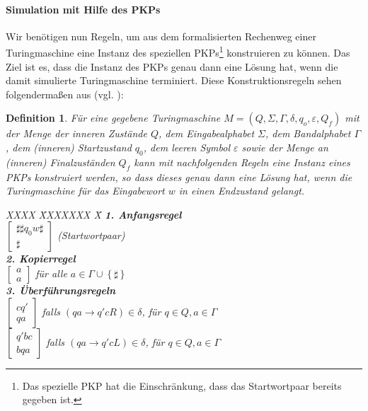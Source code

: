 \documentclass[]{scrartcl}
\newtheorem{definition}{Definition}[section]
\begin{document}
		\paragraph{Simulation mit Hilfe des PKPs}
			Wir benötigen nun Regeln, um aus dem formalisierten Rechenweg einer Turingmaschine eine Instanz des speziellen PKPs\footnote{Das spezielle PKP hat die Einschränkung, dass das Startwortpaar bereits gegeben ist.} konstruieren zu können. Das Ziel ist es, dass die Instanz des PKPs genau dann eine Lösung hat, wenn die damit simulierte Turingmaschine terminiert. Diese Konstruktionsregeln sehen folgendermaßen aus (vgl. \cite{wegener}):
			\begin{definition}
				\label{def-simulation}
				Für eine gegebene Turingmaschine $M = (Q, \Sigma, \varGamma, \delta, q_o, \varepsilon ,Q_f)$ mit der Menge der inneren Zustände $Q$, dem Eingabealphabet $\Sigma$, dem Bandalphabet $\varGamma$, dem (inneren) Startzustand $q_0$, dem leeren Symbol $\varepsilon$ sowie der Menge an (inneren) Finalzuständen $Q_f$ kann mit nachfolgenden Regeln eine Instanz eines PKPs konstruiert werden, so dass dieses genau dann eine Lösung hat, wenn die Turingmaschine für das Eingabewort $w$ in einen Endzustand gelangt.
				\begin{tabbing}
					XXXX \= XXXXXXX \= X \kill
						\textbf{1. Anfangsregel}\\
							\> \textbullet $\begin{bmatrix}\sharp\sharp q_0w\sharp \\ \sharp\end{bmatrix}$ \> (Startwortpaar)\\
						\textbf{2. Kopierregel}\\
							\> \textbullet$\begin{bmatrix} a \\ a \end{bmatrix}$ \> für alle $a \in \varGamma \cup \left\lbrace \sharp \right\rbrace$\\
						\textbf{3. Überführungsregeln}\\
							\> \textbullet$\begin{bmatrix} cq' \\ qa \end{bmatrix}$ \> falls $(qa \rightarrow q'cR) \in \delta$, für $q \in Q, a \in \varGamma$ \\
							\> \textbullet$\begin{bmatrix} q'bc \\ bqa \end{bmatrix}$ \> falls $(qa \rightarrow q'cL) \in \delta$, für $q \in Q, a \in \varGamma$\\

\end{tabbing}
\end{definition}
\end{document}
